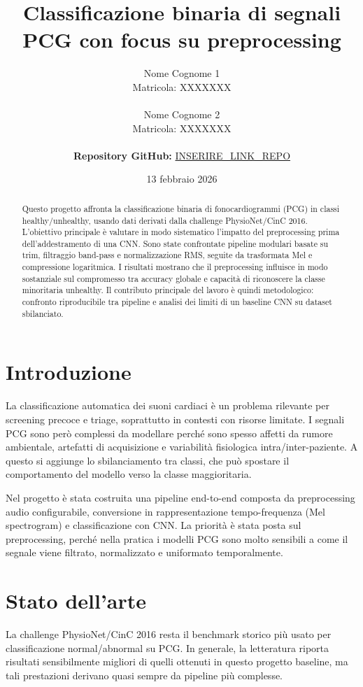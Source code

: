 \documentclass[12pt,a4paper]{article}
\title{Classificazione binaria di segnali PCG con focus su preprocessing}
\author{
    Nome Cognome 1 \\
    Matricola: XXXXXXX \\
    \\
    Nome Cognome 2 \\
    Matricola: XXXXXXX \\
    \\
    \textbf{Repository GitHub:} \url{INSERIRE_LINK_REPO}
}
\date{13 febbraio 2026}
\begin{document}
\maketitle

\begin{abstract}
Questo progetto affronta la classificazione binaria di fonocardiogrammi (PCG) in classi
healthy/unhealthy, usando dati derivati dalla challenge PhysioNet/CinC 2016. L'obiettivo
principale è valutare in modo sistematico l'impatto del preprocessing prima dell'addestramento di
una CNN. Sono state confrontate pipeline modulari basate su trim, filtraggio band-pass e
normalizzazione RMS, seguite da trasformata Mel e compressione logaritmica. I risultati mostrano
che il preprocessing influisce in modo sostanziale sul compromesso tra accuracy globale e capacità
di riconoscere la classe minoritaria unhealthy. Il contributo principale del lavoro è quindi
metodologico: confronto riproducibile tra pipeline e analisi dei limiti di un baseline CNN su
dataset sbilanciato.
\end{abstract}

\section{Introduzione}
La classificazione automatica dei suoni cardiaci è un problema rilevante per screening precoce e
triage, soprattutto in contesti con risorse limitate. I segnali PCG sono però complessi da
modellare perché sono spesso affetti da rumore ambientale, artefatti di acquisizione e variabilità
fisiologica intra/inter-paziente. A questo si aggiunge lo sbilanciamento tra classi, che può
spostare il comportamento del modello verso la classe maggioritaria.

Nel progetto è stata costruita una pipeline end-to-end composta da preprocessing audio
configurabile, conversione in rappresentazione tempo-frequenza (Mel spectrogram) e classificazione
con CNN. La priorità è stata posta sul preprocessing, perché nella pratica i modelli PCG sono molto
sensibili a come il segnale viene filtrato, normalizzato e uniformato temporalmente.

\section{Stato dell'arte}
La challenge PhysioNet/CinC 2016 resta il benchmark storico più usato per classificazione
normal/abnormal su PCG. In generale, la letteratura riporta risultati sensibilmente migliori di
quelli ottenuti in questo progetto baseline, ma tali prestazioni derivano quasi sempre da pipeline
più complesse.
\end{document}
